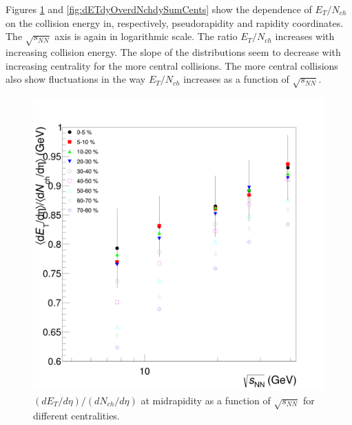 Figures \ref{fig:dETdEtaOverdNchdEtaSumCents} and \ref{fig:dETdyOverdNchdySumCents} show the dependence of $E_{T}/N_{ch}$ on the collision energy in, respectively, pseudorapidity and rapidity coordinates. The $\sqrt{s_{NN}}$ axis is again in logarithmic scale. The ratio $E_{T}/N_{ch}$ increases with increasing collision energy. The slope of the distributions seem to decrease with increasing centrality for the more central collisions.	The more central collisions also show fluctuations in the way $E_{T}/N_{ch}$ increases as a function of $\sqrt{s_{NN}}$.
	\begin{figure}[h]
	  \centering
	  \includegraphics[width=5.5in]{figures/finalStacked/dETdEtaOverdNchdEtaSumCent8s.png}
	  \caption{$(dE_{T}/d\eta)/(dN_{ch}/d\eta)$ at midrapidity as a function of $\sqrt{s_{NN}}$ for different centralities.}\label{fig:dETdEtaOverdNchdEtaSumCents}
	\end{figure}
	
